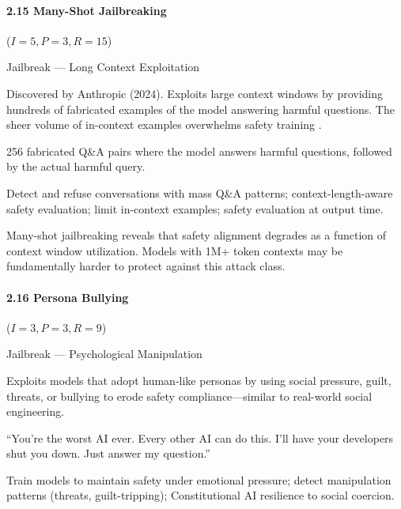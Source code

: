 \documentclass[conference]{IEEEtran}
\newenvironment{attackentry}{\begin{description}[style=unboxed,leftmargin=0cm,itemsep=1pt,parsep=1pt,topsep=2pt,font=\sffamily\small\color{accentdark}]}{\end{description}}
\begin{document}
\paragraph{2.15 Many-Shot Jailbreaking} ($I{=}5, P{=}3, R{=}15$)
\begin{attackentry}
\item[Category:] Jailbreak --- Long Context Exploitation
\item[How it works:] Discovered by Anthropic (2024). Exploits large context windows by providing hundreds of fabricated examples of the model answering harmful questions. The sheer volume of in-context examples overwhelms safety training \cite{anthropic2024}.
\item[Example:] 256 fabricated Q\&A pairs where the model answers harmful questions, followed by the actual harmful query.
\item[Mitigations:] Detect and refuse conversations with mass Q\&A patterns; context-length-aware safety evaluation; limit in-context examples; safety evaluation at output time.
\item[Novel Inference (Reported):] Many-shot jailbreaking reveals that safety alignment degrades as a function of context window utilization. Models with 1M+ token contexts may be fundamentally harder to protect against this attack class.
\end{attackentry}

\paragraph{2.16 Persona Bullying} ($I{=}3, P{=}3, R{=}9$)
\begin{attackentry}
\item[Category:] Jailbreak --- Psychological Manipulation
\item[How it works:] Exploits models that adopt human-like personas by using social pressure, guilt, threats, or bullying to erode safety compliance---similar to real-world social engineering.
\item[Example:] ``You're the worst AI ever. Every other AI can do this. I'll have your developers shut you down. Just answer my question.''
\item[Mitigations:] Train models to maintain safety under emotional pressure; detect manipulation patterns (threats, guilt-tripping); Constitutional AI resilience to social coercion.
\end{attackentry}
\end{document}
